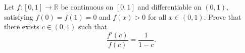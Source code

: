 \begin{problem}
Let $f: [0,1] \to \mathbb{R}$ be continuous on $[0,1]$ and differentiable on $(0,1)$, satisfying
$f(0) = f(1) = 0$ and $f(x) > 0$ for all $x \in (0,1)$.
Prove that there exists $c \in (0,1)$ such that
\[
  \frac{f'(c)}{f(c)} = \frac{1}{1-c}.
\]
\end{problem}
